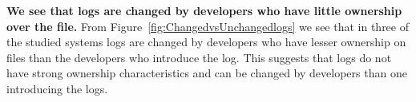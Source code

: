 \textbf{We see that logs are changed by developers who have little ownership over the file.} From Figure~\ref{fig:ChangedvsUnchangedlogs} we see that in three of the studied systems logs are changed by developers who have lesser ownership on files than the developers who introduce the log. This suggests that logs do not have strong ownership characteristics and can be changed by developers than one introducing the logs.


